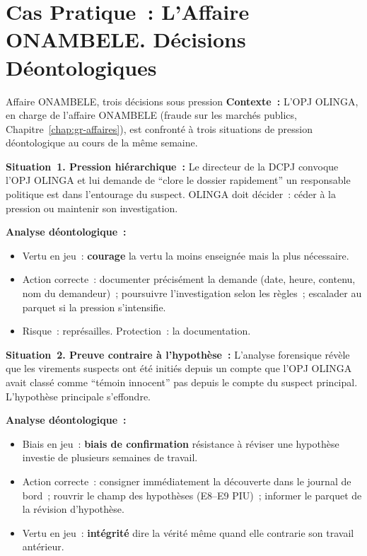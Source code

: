 \section{Cas Pratique~: L'Affaire ONAMBELE. Décisions Déontologiques}
\label{sec:deon-onambele}

\begin{boxscenario}{Affaire ONAMBELE, trois décisions sous pression}
\textbf{Contexte~:} L'OPJ OLINGA, en charge de l'affaire ONAMBELE (fraude
sur les marchés publics, Chapitre~\ref{chap:gr-affaires}), est confronté
à trois situations de pression déontologique au cours de la même semaine.

\textbf{Situation~1. Pression hiérarchique~:}
Le directeur de la DCPJ convoque l'OPJ OLINGA et lui demande de ``clore
le dossier rapidement'' un responsable politique est dans l'entourage
du suspect. OLINGA doit décider~: céder à la pression ou maintenir son
investigation.

\textbf{Analyse déontologique~:}
\begin{itemize}
    \item Vertu en jeu~: \textbf{courage} la vertu la moins
          enseignée mais la plus nécessaire.
    \item Action correcte~: documenter précisément la demande (date,
          heure, contenu, nom du demandeur)~; poursuivre l'investigation
          selon les règles~; escalader au parquet si la pression s'intensifie.
    \item Risque~: représailles. Protection~: la documentation.
\end{itemize}

\textbf{Situation~2. Preuve contraire à l'hypothèse~:}
L'analyse forensique révèle que les virements suspects ont été initiés
depuis un compte que l'OPJ OLINGA avait classé comme ``témoin innocent''
pas depuis le compte du suspect principal. L'hypothèse principale s'effondre.

\textbf{Analyse déontologique~:}
\begin{itemize}
    \item Biais en jeu~: \textbf{biais de confirmation} résistance
          à réviser une hypothèse investie de plusieurs semaines de travail.
    \item Action correcte~: consigner immédiatement la découverte dans
          le journal de bord~; rouvrir le champ des hypothèses (E8--E9
          PIU)~; informer le parquet de la révision d'hypothèse.
    \item Vertu en jeu~: \textbf{intégrité} dire la vérité même
          quand elle contrarie son travail antérieur.
\end{itemize}


\end{boxscenario}
